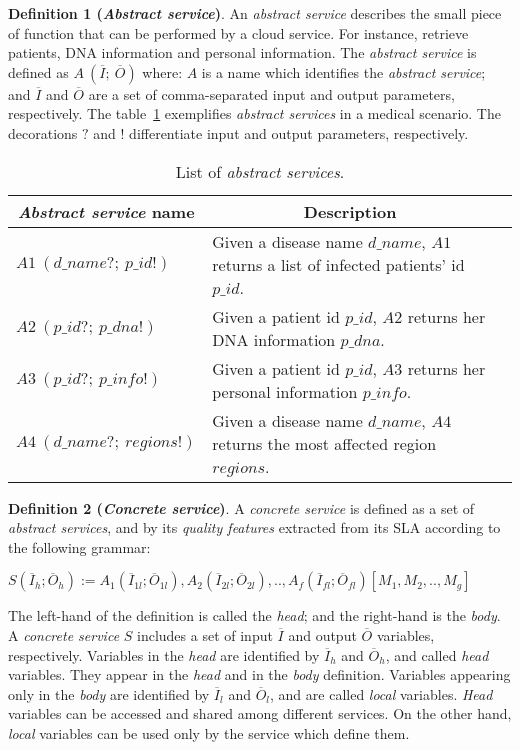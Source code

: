 \bigskip

\noindent \textbf{Definition 1 (\textit{Abstract service})}. An \textit{abstract service} describes the small piece of function that can be performed by a cloud service. For instance, retrieve patients, DNA information and personal information. The \textit{abstract service} is defined as $A \ (\overline{I}; \ \overline{O})$ where: $A$ is a name which identifies the \textit{abstract service}; and $\overline{I}$ and $\overline{O}$ are a set of comma-separated input and output parameters, respectively.
The table~\ref{table:abstractservices} exemplifies \textit{abstract services} in a medical scenario. 
The decorations $?$ and $!$ differentiate input and output parameters, respectively. 
\begin{table}[]
\centering
\begin{tabular}{|l|p{8cm}|l|}
\hline
\multicolumn{1}{|c|}{\textbf{\textit{Abstract service} name}} & \multicolumn{1}{c|}{\textbf{Description}} \\ \hline
$A1 \ (d\_name?; \ p\_id!)$ & Given a disease name $d\_name$, $A1$ returns a list of infected patients' id $p\_id$. \\ \hline
$A2 \ (p\_id?; \ p\_dna!)$ & Given a patient id $p\_id$, $A2$ returns her DNA information $p\_dna$. \\ \hline
$A3 \ (p\_id?; \ p\_info!)$ & Given a patient id $p\_id$, $A3$ returns her personal information $p\_info$.\\ \hline
$A4 \ (d\_name?; \ regions!)$ & Given a disease name $d\_name$, $A4$ returns the most affected region $regions$. \\ \hline
\end{tabular}
\caption{List of \textit{abstract services}.}
\label{table:abstractservices}
\end{table}
\bigskip

\noindent \textbf{Definition 2 (\textit{Concrete service})}. A \textit{concrete service} is defined as a set of \textit{abstract services}, and by its \textit{quality features} extracted from its SLA according to the following grammar:
%
\begin{center}
\begin{math}
S (\overline{I}_{h}; \overline{O}_{h}) := A_{1}(\overline{I}_{1l}; \overline{O}_{1l}), A_{2}(\overline{I}_{2l}; \overline{O}_{2l}), ..,  A_{f}(\overline{I}_{fl}; \overline{O}_{fl})[M_{1},M_{2}, ..,M_{g}]
\end{math}
\end{center}
The left-hand of the definition is called the \textit{head}; and the right-hand is the \textit{body}. 
A \textit{concrete service} $S$ includes a set of input $\overline{I}$ and output $\overline{O}$ variables, respectively.
Variables in the \textit{head} are identified by $\overline{I}_{h}$ and $\overline{O}_{h}$, and called \textit{head} variables. 
They appear in the \textit{head} and in the \textit{body} definition. 
Variables appearing only in the \textit{body} are identified by $\overline{I}_{l}$ and $\overline{O}_{l}$, and are called \textit{local} variables. \textit{Head} variables can be accessed and shared among different services. On the other hand, \textit{local} variables can be used only by the service which define them.

